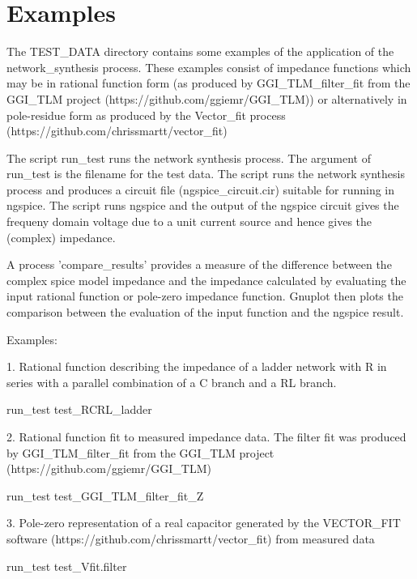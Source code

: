 \section{Examples} \label{examples}

The TEST\_DATA directory contains some examples of the application of the network\_synthesis process. These examples consist of impedance functions which may be in rational function form (as produced by GGI\_TLM\_filter\_fit 
from the GGI\_TLM project (https://github.com/ggiemr/GGI\_TLM)) or alternatively
in pole-residue form as produced by the Vector\_fit process (https://github.com/chrissmartt/vector\_fit)

The script run\_test runs the network synthesis process. The argument of run\_test is the filename for 
the test data. The script runs the network synthesis process and produces a circuit file (ngspice\_circuit.cir)
suitable for running in ngspice. The script runs ngspice and the output of the ngspice circuit gives the frequeny domain voltage due to 
a unit current source and hence gives the (complex) impedance. 

A process 'compare\_results' provides a measure of the difference between the complex spice model impedance and the
impedance calculated by evaluating the input rational function or pole-zero impedance function. 
Gnuplot then plots the comparison between the evaluation of the input function and the ngspice result. 

Examples:

1. Rational function describing the impedance of a ladder network with R in series with a parallel combination
of a C branch and a RL branch.

run\_test test\_RCRL\_ladder

2. Rational function fit to measured impedance data. 
The filter fit was produced by GGI\_TLM\_filter\_fit from the GGI\_TLM project (https://github.com/ggiemr/GGI\_TLM)

run\_test test\_GGI\_TLM\_filter\_fit\_Z

3. Pole-zero representation of a real capacitor generated by the VECTOR\_FIT software (https://github.com/chrissmartt/vector\_fit)
from measured data

run\_test test\_Vfit.filter




\clearpage
